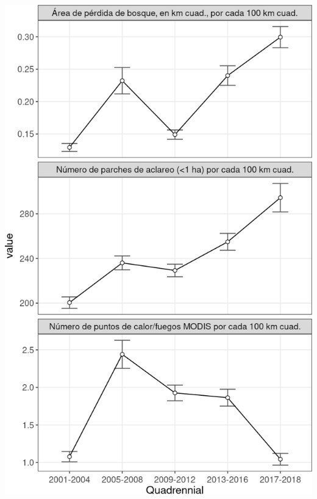 \documentclass[10pt,landscape,a3paper]{article}
\begin{document}
\begin{center}\includegraphics{img/modelling/aa-eda-ts-16} \end{center}
\end{document}
